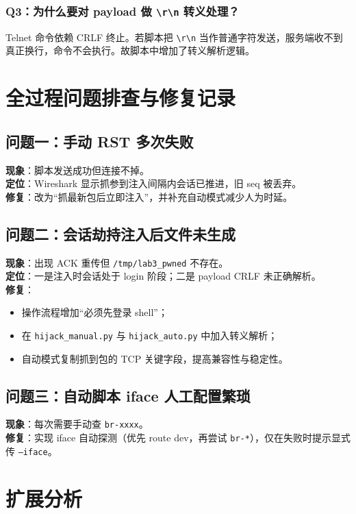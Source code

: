 \documentclass[12pt,hyperref,a4paper,UTF8,fontset=none]{ctexart}
\newcommand{\term}[1]{\textbf{#1}}
\begin{document}
\subsubsection{Q3：为什么要对 payload 做 \texttt{\textbackslash r\textbackslash n} 转义处理？}
Telnet 命令依赖 CRLF 终止。若脚本把 \texttt{\textbackslash r\textbackslash n} 当作普通字符发送，服务端收不到真正换行，命令不会执行。故脚本中增加了转义解析逻辑。

\section{全过程问题排查与修复记录}
\subsection{问题一：手动 RST 多次失败}
\term{现象}：脚本发送成功但连接不掉。\\
\term{定位}：Wireshark 显示抓参到注入间隔内会话已推进，旧 seq 被丢弃。\\
\term{修复}：改为“抓最新包后立即注入”，并补充自动模式减少人为时延。

\subsection{问题二：会话劫持注入后文件未生成}
\term{现象}：出现 ACK 重传但 \texttt{/tmp/lab3\_pwned} 不存在。\\
\term{定位}：一是注入时会话处于 login 阶段；二是 payload CRLF 未正确解析。\\
\term{修复}：
\begin{itemize}
    \item 操作流程增加“必须先登录 shell”；
    \item 在 \texttt{hijack\_manual.py} 与 \texttt{hijack\_auto.py} 中加入转义解析；
    \item 自动模式复制抓到包的 TCP 关键字段，提高兼容性与稳定性。
\end{itemize}

\subsection{问题三：自动脚本 iface 人工配置繁琐}
\term{现象}：每次需要手动查 \texttt{br-xxxx}。\\
\term{修复}：实现 iface 自动探测（优先 route dev，再尝试 \texttt{br-*}），仅在失败时提示显式传 \texttt{--iface}。

\section{扩展分析}
\end{document}
